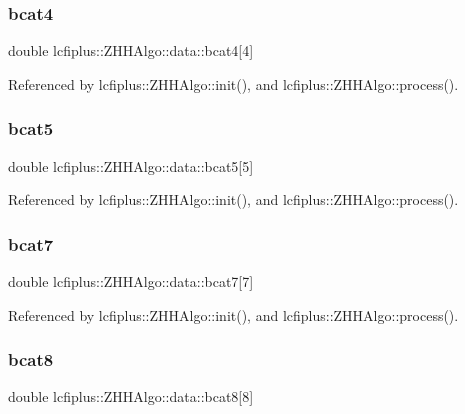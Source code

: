\subsubsection{bcat4}
{\footnotesize\ttfamily double lcfiplus\+::\+Z\+H\+H\+Algo\+::data\+::bcat4[4]}



Referenced by lcfiplus\+::\+Z\+H\+H\+Algo\+::init(), and lcfiplus\+::\+Z\+H\+H\+Algo\+::process().

\mbox{\label{structlcfiplus_1_1ZHHAlgo_1_1data_a29ac8539d5d9f00472fcbaceaecadb29}} 
\subsubsection{bcat5}
{\footnotesize\ttfamily double lcfiplus\+::\+Z\+H\+H\+Algo\+::data\+::bcat5[5]}



Referenced by lcfiplus\+::\+Z\+H\+H\+Algo\+::init(), and lcfiplus\+::\+Z\+H\+H\+Algo\+::process().

\mbox{\label{structlcfiplus_1_1ZHHAlgo_1_1data_a1e528fa8bf997c21f9001ae551d13f7c}} 
\subsubsection{bcat7}
{\footnotesize\ttfamily double lcfiplus\+::\+Z\+H\+H\+Algo\+::data\+::bcat7[7]}



Referenced by lcfiplus\+::\+Z\+H\+H\+Algo\+::init(), and lcfiplus\+::\+Z\+H\+H\+Algo\+::process().

\mbox{\label{structlcfiplus_1_1ZHHAlgo_1_1data_aa65dc5aa9a40d1de5056c561ab22d289}} 
\subsubsection{bcat8}
{\footnotesize\ttfamily double lcfiplus\+::\+Z\+H\+H\+Algo\+::data\+::bcat8[8]}



